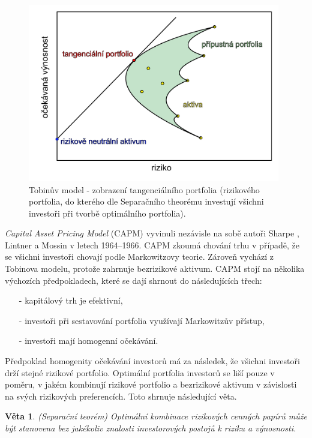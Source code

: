 \documentclass[a4paper,12pt]{report}
\newtheorem{veta}{Věta}
\theoremstyle{definition} \newtheorem{definice}[veta]{Definice}
\theoremstyle{remark}
\begin{document}
\begin{figure}[!htbp]
  \centering 
  \includegraphics[width=11cm]{IMG/graf_1.pdf}
  \caption{Tobinův model - zobrazení tangenciálního portfolia (rizikového portfolia, do kterého dle Separačního theorému investují všichni investoři při tvorbě optimálního portfolia).}
  \label{obr_Tobin_2}
\end{figure}

\textit{Capital Asset Pricing Model} (CAPM) vyvinuli nezávisle na sobě autoři Sharpe \cite{sharpe1964}, Lintner \cite{lintner1965} a Mossin \cite{mossin1966} v letech 1964--1966. CAPM zkoumá chování trhu v případě, že se všichni investoři chovají podle Markowitzovy teorie.
Zároveň vychází z Tobinova modelu, protože zahrnuje bezrizikové aktivum.
CAPM stojí na několika výchozích předpokladech, které se dají shrnout do následujících třech:
\begin{itemize}
\item[-] kapitálový trh je efektivní,
\item[-] investoři při sestavování portfolia využívají Markowitzův přístup,
\item[-] investoři mají homogenní očekávání.
\end{itemize}
Předpoklad homogenity očekávání investorů má za následek, že všichni investoři drží stejné rizikové portfolio.
Optimální portfolia investorů se liší pouze v poměru, v jakém kombinují rizikové portfolio a bezrizikové aktivum v závislosti na svých rizikových preferencích.
Toto shrnuje následující věta.

\begin{veta}(Separační teorém)
Optimální kombinace rizikových cenných papírů může být stanovena bez jakékoliv znalosti investorových postojů k riziku a výnosnosti.
\end{veta}
\end{document}
